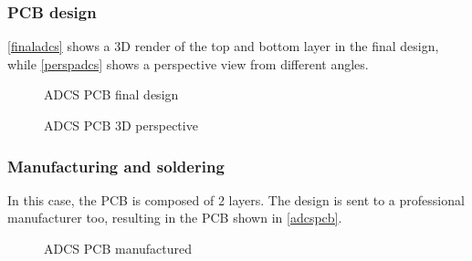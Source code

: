 \newpage
\subsubsection{PCB design} \label{adcsdes}
\autoref{finaladcs} shows a 3D render of the top and bottom layer in the final design, while \autoref{perspadcs} shows a perspective view from different angles. 			





			\begin{figure}[H]
			\centering
			\quad
			\caption{\acrshort{ADCS} \acrshort{PCB} final design} \label{finaladcs}
\end{figure}

\vspace{1cm}


		\begin{figure}[H]
			\centering
			\quad
			\caption{\acrshort{ADCS} \acrshort{PCB} 3D perspective} \label{perspadcs}
			\vspace{-2cm}
\end{figure}

%
%


\subsubsection{Manufacturing and soldering}

In this case, the \acrshort{PCB} is composed of 2 layers. The design is sent to a professional manufacturer too, resulting in the \acrshort{PCB} shown in \autoref{adcspcb}.

\begin{figure}[H]
			\centering
			\quad
			\caption{\acrshort{ADCS} \acrshort{PCB} manufactured} \label{adcspcb}
			\vspace{-0.5cm}
\end{figure}

